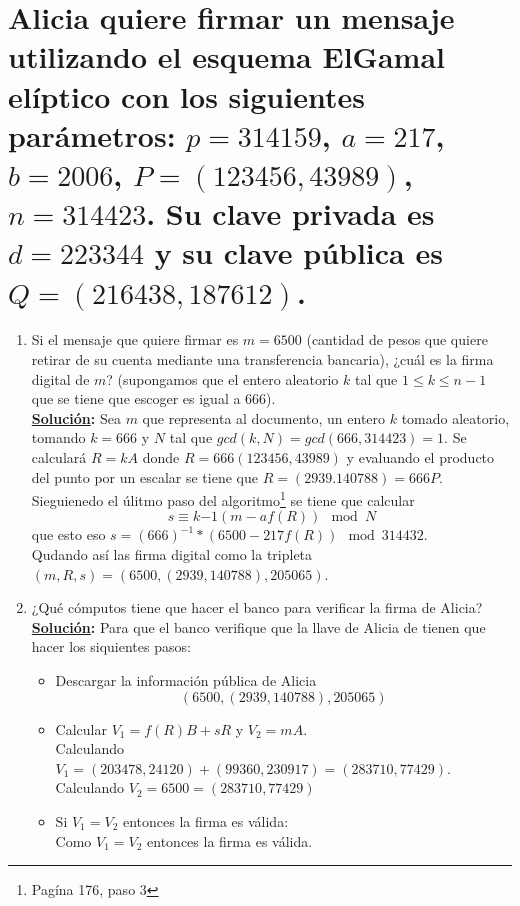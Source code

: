 \documentclass[11pt,letterpaper]{article}
\newcommand{\sol}{\textbf{\underline{Solución}: }} %
\begin{document}
\begin{enumerate}[label=(\roman*)]
\end{enumerate}

\section{Alicia quiere firmar un mensaje utilizando el esquema ElGamal elíptico con los
siguientes parámetros: $p = 314159$, $a = 217$, $b = 2006$, $P = (123456, 43989)$, $n = 314423$.
Su clave privada es $d = 223344$ y su clave pública es $Q = (216438, 187612)$.}

\begin{enumerate}[label=(\roman*)]
    \item Si el mensaje que quiere firmar es $m = 6500$ (cantidad de pesos que quiere retirar
    de su cuenta mediante una transferencia bancaria), ¿cuál es la firma digital de $m$?
    (supongamos que el entero aleatorio $k$ tal que $1 \leq k \leq n-1$ que se tiene que
    escoger es igual a 666).\\
    \sol Sea $m$ que representa al documento, un entero $k$ tomado aleatorio, tomando $k=666$ y $N$
    tal que $gcd(k, N) = gcd(666,314423) = 1$. Se calculará $R = kA$ donde $R = 666(123456, 43989)$
    y evaluando el producto del punto por un escalar se tiene que $R = (2939. 140788) = 666P$.\\
    Sieguienedo el úlitmo paso del algoritmo\footnote{Pagína 176, paso 3} se tiene que calcular
    $$s \equiv k{-1} (m - af(R)) \mod N$$
    que esto eso $s = (666)^{-1} * (6500  -217 f(R)) \mod 314432$.\\
    Qudando así las firma digital como la tripleta $(m,R,s) = (6500, (2939, 140788), 205065)$.

    \item ¿Qué cómputos tiene que hacer el banco para verificar la firma de Alicia?\\
    \sol Para que el banco verifique que la llave de Alicia de tienen que hacer los siquientes pasos:
    \begin{itemize}
        \item Descargar la información pública de Alicia
        $$(6500, (2939, 140788), 205065)$$
        
        \item Calcular $V_1 = f(R)B + sR$ y $V_2 = mA$.\\
        Calculando $V_1 = (203478, 24120) + (99360, 230917) = (283710, 77429)$.\\
        Calculando $V_2 = 6500 = (283710, 77429)$
        
        \item Si $V_1 = V_2$ entonces la firma es válida:\\
        Como $V_1 = V_2$ entonces la firma es válida.
        
    \end{itemize}

\end{enumerate}
\end{document}
